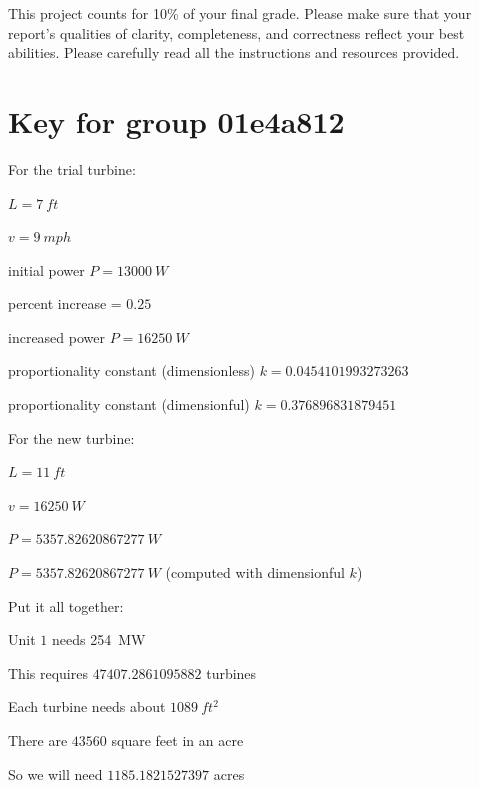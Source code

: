 \documentclass[11pt]{article}
\begin{document}
This project counts for 10\% of your final grade. Please make sure that
your report's qualities of clarity, completeness, and correctness
reflect your best abilities. Please carefully read all the instructions
and resources provided.


\newpage

\section*{Key for group 01e4a812}

For the trial turbine:

\begin{compactenum}
    \item $L = \SI{7}{ft}$
    \item $v = \SI{9}{mph}$
    \item initial power $P = \SI{13000}{W}$
    \item percent increase = $0.25$
    \item increased power $P = \SI{16250}{W}$
    \item proportionality constant (dimensionless) $k = 0.0454101993273263$
    \item proportionality constant (dimensionful) $k = 0.376896831879451$
\end{compactenum}

For the new turbine:

\begin{compactenum}
    \item $L = \SI{11}{ft}$
    \item $v = \SI{16250}{W}$
    \item $P = \SI{5357.82620867277}{W}$
    \item $P = \SI{5357.82620867277}{W}$ (computed with dimensionful $k$)
\end{compactenum}

Put it all together:

\begin{compactenum}
    \item Unit $1$ needs \SI{254}{MW}
    \item This requires $47407.2861095882$ turbines
    \item Each turbine needs about $\SI{1089}{ft^2}$
    \item There are $43560$ square feet in an acre
    \item So we will need $1185.1821527397$ acres
\end{compactenum}

\end{document}
